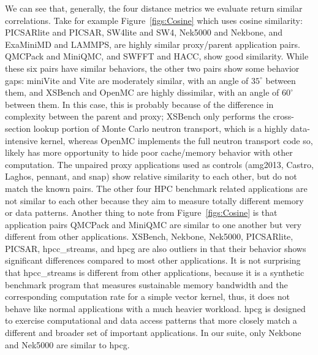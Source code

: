 We can see that, generally, the four distance metrics we evaluate return similar correlations. Take for example Figure~\ref{figs:Cosine} which uses cosine similarity: PICSARlite and PICSAR, SW4lite and SW4, Nek5000 and Nekbone, and ExaMiniMD and LAMMPS, are highly similar proxy/parent application pairs. QMCPack and MiniQMC, and SWFFT and HACC, show good similarity.  While these six pairs have similar behaviors, the other two pairs show some behavior gaps: miniVite and Vite are moderately similar, with an angle of $35^\circ$ between them, and XSBench and OpenMC are highly dissimilar, with an angle of $60^\circ$ between them. In this case, this is probably because of the difference in complexity between the parent and proxy; XSBench only performs the cross-section lookup portion of Monte Carlo neutron transport, which is a highly data-intensive kernel, whereas OpenMC implements the full neutron transport code so, likely has more opportunity to hide poor cache/memory behavior with other computation. The unpaired proxy applications used as controls (amg2013, Castro, Laghos, pennant, and snap) show relative similarity to each other, but do not match the known pairs. The other four HPC benchmark related applications are not similar to each other because they aim to measure totally different memory or data patterns. Another thing to note from Figure~\ref{figs:Cosine} is that application pairs QMCPack and MiniQMC are similar to one another but very different from other applications. XSBench, Nekbone, Nek5000, PICSARlite, PICSAR, hpcc\_streams, and hpcg are also outliers in that their behavior shows significant differences compared to most other applications.  It is not surprising that hpcc\_streams is different from other applications, because it is a synthetic benchmark program that measures sustainable memory bandwidth and the corresponding computation rate for a simple vector kernel, thus, it does not behave like normal applications with a much heavier workload. hpcg is designed to exercise computational and data access patterns that more closely match a different and broader set of important applications. In our suite, only Nekbone and Nek5000 are similar to hpcg.

